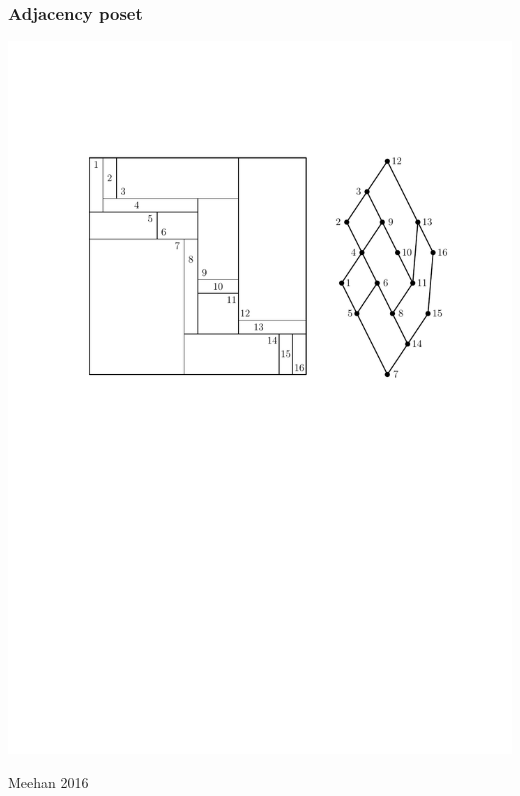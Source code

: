 \documentclass[11pt]{beamer}%
\newcommand{\green}{\color{darkgreen}}
\newcommand{\auth}[1]{{\green\hfill{\footnotesize #1}}}
\begin{document}
\begin{frame}
  \frametitle{Adjacency poset}
    \begin{center}
      \includegraphics[height=.7\textheight]{w_poset_v2.pdf}
    \end{center}
    \auth{Meehan 2016} 
\end{frame}
\end{document}
